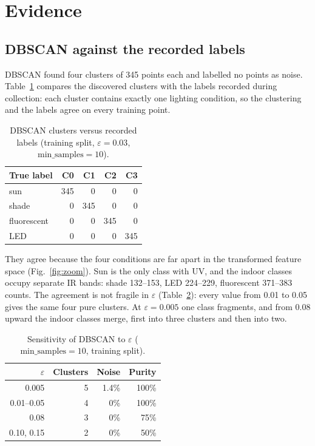 \documentclass[10pt,a4paper,twocolumn]{article}
\begin{document}
\section{Evidence}
\label{sec:evidence}

\subsection{DBSCAN against the recorded labels}

DBSCAN found four clusters of 345 points each and labelled no points as noise. Table~\ref{tab:confusion_dbscan} compares the discovered clusters with the labels recorded during collection: each cluster contains exactly one lighting condition, so the clustering and the labels agree on every training point.

\begin{table}[!bt]
\centering
\small
\caption{DBSCAN clusters versus recorded labels (training split, $\varepsilon=0.03$, $\mathrm{min\_samples}=10$).}
\label{tab:confusion_dbscan}
\begin{tabular}{@{}lrrrr@{}}
\toprule
True label & C0 & C1 & C2 & C3 \\
\midrule
sun         & 345 & 0   & 0   & 0 \\
shade       & 0   & 345 & 0   & 0 \\
fluorescent & 0   & 0   & 345 & 0 \\
LED         & 0   & 0   & 0   & 345 \\
\bottomrule
\end{tabular}
\end{table}

They agree because the four conditions are far apart in the transformed feature space (Fig.~\ref{fig:zoom}). Sun is the only class with UV, and the indoor classes occupy separate IR bands: shade 132--153, LED 224--229, fluorescent 371--383 counts. The agreement is not fragile in $\varepsilon$ (Table~\ref{tab:eps}): every value from 0.01 to 0.05 gives the same four pure clusters. At $\varepsilon = 0.005$ one class fragments, and from 0.08 upward the indoor classes merge, first into three clusters and then into two.

\begin{table}[!bt]
\centering
\small
\caption{Sensitivity of DBSCAN to $\varepsilon$ ($\mathrm{min\_samples}=10$, training split).}
\label{tab:eps}
\begin{tabular}{@{}rrrr@{}}
\toprule
$\varepsilon$ & Clusters & Noise & Purity \\
\midrule
0.005 & 5 & 1.4\% & 100\% \\
0.01--0.05 & 4 & 0\% & 100\% \\
0.08 & 3 & 0\% & 75\% \\
0.10, 0.15 & 2 & 0\% & 50\% \\
\bottomrule
\end{tabular}
\end{table}
\end{document}
